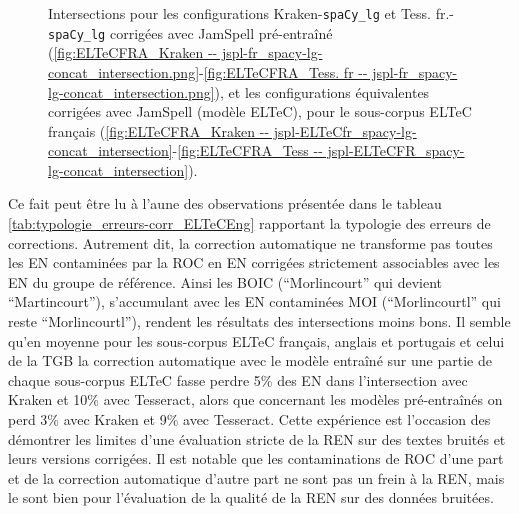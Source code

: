 \begin{figure}[h!]
\caption{Intersections pour les configurations Kraken-\texttt{spaCy\_lg} et Tess. fr.-\texttt{spaCy\_lg} corrigées avec JamSpell pré-entraîné (\ref{fig:ELTeCFRA_Kraken -- jspl-fr_spacy-lg-concat_intersection.png}-\ref{fig:ELTeCFRA_Tess. fr -- jspl-fr_spacy-lg-concat_intersection.png}), et les configurations équivalentes corrigées avec JamSpell (modèle ELTeC), pour le sous-corpus ELTeC français (\ref{fig:ELTeCFRA_Kraken -- jspl-ELTeCfr_spacy-lg-concat_intersection}-\ref{fig:ELTeCFRA_Tess -- jspl-ELTeCFR_spacy-lg-concat_intersection}).}
\label{fig:intersection_globale-kraken}
\end{figure}

Ce fait peut être lu à l'aune %
des observations présentée dans le tableau \ref{tab:typologie_erreurs-corr_ELTeCEng} rapportant la typologie des erreurs de corrections. Autrement dit, la correction automatique ne transforme pas toutes les EN contaminées par la ROC en EN corrigées strictement associables avec les EN du groupe de référence. Ainsi les BOIC (``Morlincourt'' qui devient ``Martincourt''), s'accumulant avec les EN contaminées MOI (``Morlincourtl'' qui reste ``Morlincourtl''), rendent les résultats des intersections moins bons. Il semble qu'en moyenne pour les sous-corpus ELTeC français, anglais et portugais et celui de la TGB la correction automatique avec le modèle entraîné sur une partie de chaque sous-corpus ELTeC fasse perdre 5\% des EN dans l'intersection avec Kraken et 10\% avec Tesseract, alors que concernant les modèles pré-entraînés on perd 3\% avec Kraken et 9\% avec Tesseract. Cette expérience est l'occasion des démontrer les limites d'une évaluation stricte de la REN sur des textes bruités et leurs versions corrigées. Il est notable que les contaminations de ROC d'une part et de la correction automatique d'autre part ne sont pas un frein à la REN, mais le sont bien pour l'évaluation de la qualité de la REN sur des données bruitées.

